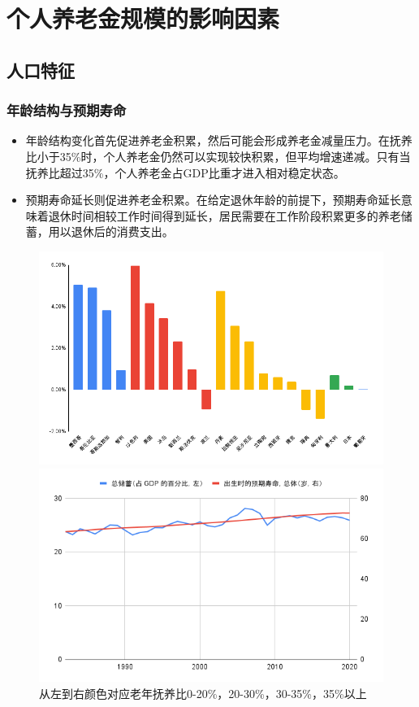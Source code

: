 \documentclass[a4paper,zihao=5]{ctexbeamer}
\begin{document}
\section{个人养老金规模的影响因素}

\subsection{人口特征}
\begin{frame}
    \frametitle{年龄结构与预期寿命}
    \begin{itemize}
        \item 年龄结构变化首先促进养老金积累，然后可能会形成养老金减量压力。在抚养比小于35\%时，个人养老金仍然可以实现较快积累，但平均增速递减。只有当抚养比超过35\%，个人养老金占GDP比重才进入相对稳定状态。
        \item 预期寿命延长则促进养老金积累。在给定退休年龄的前提下，预期寿命延长意味着退休时间相较工作时间得到延长，居民需要在工作阶段积累更多的养老储蓄，用以退休后的消费支出。
    \end{itemize}
    \begin{figure}[H]
        \centering
        \begin{minipage}{0.48\linewidth}
            \centering
            \includegraphics[width=\linewidth]{img/随着老年付养比提高，养老金积累增速开始下降.png}
            \caption{从左到右颜色对应老年抚养比0-20\%，20-30\%，30-35\%，35\%以上}
        \end{minipage}
        \begin{minipage}{0.48\linewidth}
            \includegraphics[width=\linewidth]{img/人口预期寿命与储蓄占GDP比重同步上升.png}

\end{minipage}
\end{figure}
\end{frame}
\end{document}
